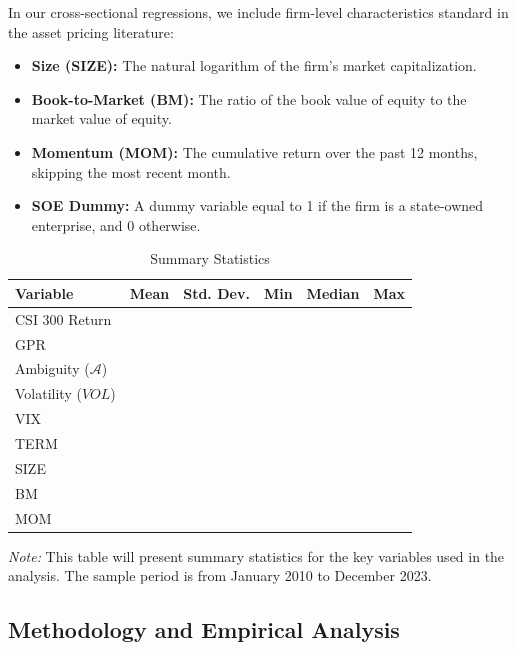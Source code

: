 \documentclass[preprint,12pt,authoryear]{elsarticle}
\begin{document}
In our cross-sectional regressions, we include firm-level characteristics standard in the asset pricing literature:
\begin{itemize}
    \item \textbf{Size (SIZE):} The natural logarithm of the firm's market capitalization.
    \item \textbf{Book-to-Market (BM):} The ratio of the book value of equity to the market value of equity.
    \item \textbf{Momentum (MOM):} The cumulative return over the past 12 months, skipping the most recent month.
    \item \textbf{SOE Dummy:} A dummy variable equal to 1 if the firm is a state-owned enterprise, and 0 otherwise.
\end{itemize}

\begin{table}[H]
\centering
\caption{Summary Statistics}
\label{tab:summary_stats}
\begin{threeparttable}
\begin{tabular}{lccccc}
\toprule
Variable & Mean & Std. Dev. & Min & Median & Max \\
\midrule
CSI 300 Return & & & & & \\
GPR & & & & & \\
Ambiguity ($\mathcal{A}$) & & & & & \\
Volatility ($VOL$) & & & & & \\
VIX & & & & & \\
TERM & & & & & \\
SIZE & & & & & \\
BM & & & & & \\
MOM & & & & & \\
\bottomrule
\end{tabular}
\begin{tablenotes}
\item \textit{Note:} This table will present summary statistics for the key variables used in the analysis. The sample period is from January 2010 to December 2023.
\end{tablenotes}
\end{threeparttable}
\end{table}

\subsection{Methodology and Empirical Analysis}
\end{document}
